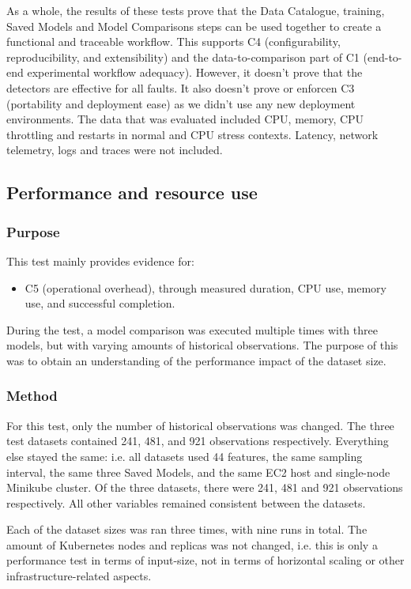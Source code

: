As a whole, the results of these tests prove that the Data Catalogue, training, Saved Models and Model Comparisons steps can be used together to create a functional and traceable workflow. This supports C4 (configurability, reproducibility, and extensibility) and the data-to-comparison part of C1 (end-to-end experimental workflow adequacy). However, it doesn’t prove that the detectors are effective for all faults. It also doesn’t prove or enforcen C3 (portability and deployment ease) as we didn’t use any new deployment environments. The data that was evaluated included CPU, memory, CPU throttling and restarts in normal and CPU stress contexts. Latency, network telemetry, logs and traces were not included.

\subsection{Performance and resource use}

\subsubsection{Purpose}
This test mainly provides evidence for:
\begin{itemize}
    \item C5 (operational overhead), through measured duration, CPU use, memory use, and successful completion.
\end{itemize}

During the test, a model comparison was executed multiple times with three models, but with varying amounts of historical observations. The purpose of this was to obtain an understanding of the performance impact of the dataset size.

\subsubsection{Method}

For this test, only the number of historical observations was changed. The three test datasets contained 241, 481, and 921 observations respectively. Everything else stayed the same: i.e. all datasets used 44 features, the same sampling interval, the same three Saved Models, and the same EC2 host and single-node Minikube cluster. Of the three datasets, there were 241, 481 and 921 observations respectively. All other variables remained consistent between the datasets.

Each of the dataset sizes was ran three times, with nine runs in total. The amount of Kubernetes nodes and replicas was not changed, i.e. this is only a performance test in terms of input-size, not in terms of horizontal scaling or other infrastructure-related aspects.

